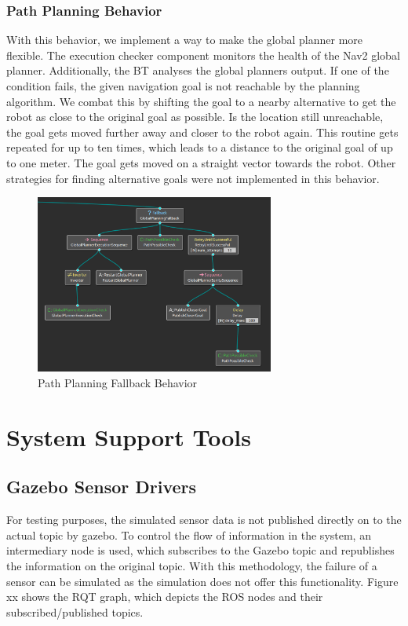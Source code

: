\subsubsection{Path Planning Behavior}

With this behavior, we implement a way to make the global planner more flexible. 
The execution checker component monitors the health of the Nav2 global planner. Additionally, the BT analyses the global planners output. If one of the condition fails, the given navigation goal is not reachable by the planning algorithm. We combat this by shifting the goal to a nearby alternative to get the robot as close to the original goal as possible. Is the location still unreachable, the goal gets moved further away and closer to the robot again. This routine gets repeated for up to ten times, which leads to a distance to the original goal of up to one meter. 
The goal gets moved on a straight vector towards the robot. Other strategies for finding alternative goals were not implemented in this behavior.


\begin{figure}[h!]
	\includegraphics[width=0.7\textwidth]{images/global_planning_fallback.png}
	\caption{Path Planning Fallback Behavior}
\end{figure}



\section{System Support Tools}
\subsection{Gazebo Sensor Drivers}
For testing purposes, the simulated sensor data is not published directly on to the actual topic by gazebo. To control the flow of information in the system, an intermediary node is used, which subscribes to the Gazebo topic and republishes the information on the original topic. With this methodology, the failure of a sensor can be simulated as the simulation does not offer this functionality. Figure xx shows the RQT graph, which depicts the ROS nodes and their subscribed/published topics. 

